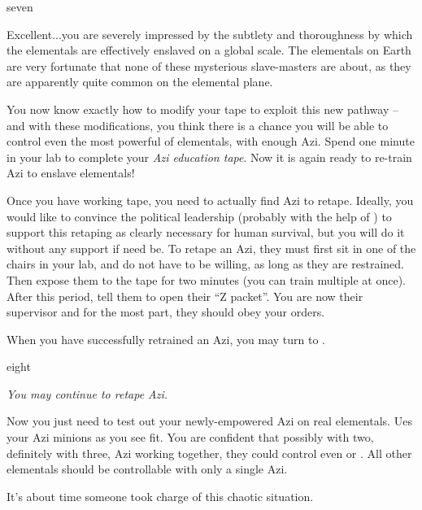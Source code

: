 \documentclass[notebook]{elementals}
\begin{document}
\begin{page}{seven}

Excellent...you are severely impressed by the subtlety and thoroughness by which the elementals are effectively enslaved on a global scale. The elementals on Earth are very fortunate that none of these mysterious slave-masters are about, as they are apparently quite common on the elemental plane.

You now know exactly how to modify your tape to exploit this new pathway -- and with these modifications, you think there is a chance you will be able to control even the most powerful of elementals, with enough Azi. Spend one minute in your lab to complete your \emph{Azi education tape}. Now it is again ready to re-train Azi to enslave elementals!

Once you have working tape, you need to actually find Azi to retape. Ideally, you would like to convince the political leadership (probably with the help of \cDema{}) to support this retaping as clearly necessary for human survival, but you will do it without any support if need be. To retape an Azi, they must first sit in one of the chairs in your lab, and do not have to be willing, as long as they are restrained. Then expose them to the tape for two minutes (you can train multiple at once). After this period, tell them to open their ``Z packet''. You are now their supervisor and for the most part, they should obey your orders.

When you have successfully retrained an Azi, you may turn to .

\end{page}

\begin{page}{eight}

\emph{You may continue to retape Azi.}

Now you just need to test out your newly-empowered Azi on real elementals. Ues your Azi minions as you see fit. You are confident that possibly with two, definitely with three, Azi working together, they could control even \cQueen{} or \cKing{}. All other elementals should be controllable with only a single Azi.

It's about time someone took charge of this chaotic situation.

\end{page}

\endnotebook
\end{document}
